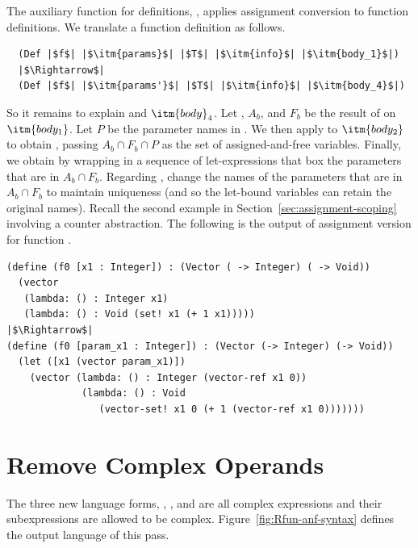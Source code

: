 \documentclass[11pt]{book}
\newcommand{\ocaml}[1]{{\color{blue}{#1}}}
\begin{document}
The auxiliary function for definitions, ,
applies assignment conversion to function definitions.
We translate a function definition as follows.
\begin{lstlisting}
  (Def |$f$| |$\itm{params}$| |$T$| |$\itm{info}$| |$\itm{body_1}$|)
  |$\Rightarrow$|
  (Def |$f$| |$\itm{params'}$| |$T$| |$\itm{info}$| |$\itm{body_4}$|)
\end{lstlisting}
So it remains to explain  and $\itm{body}_4$.
Let , $A_b$, and $F_b$ be the result of
 on $\itm{body_1}$.
Let $P$ be the parameter names in .
We then apply  to $\itm{body_2}$ to
obtain , passing $A_b \cap F_b \cap P$
as the set of assigned-and-free variables.
Finally, we obtain  by wrapping 
in a sequence of let-expressions that box the parameters
that are in $A_b \cap F_b$.
%
Regarding , change the names of the parameters that are
in $A_b \cap F_b$ to maintain uniqueness (and so the let-bound
variables can retain the original names). Recall the second example in
Section~\ref{sec:assignment-scoping} involving a counter
abstraction. The following is the output of assignment version for
function .
\begin{lstlisting}
(define (f0 [x1 : Integer]) : (Vector ( -> Integer) ( -> Void))
  (vector
   (lambda: () : Integer x1)
   (lambda: () : Void (set! x1 (+ 1 x1)))))
|$\Rightarrow$|
(define (f0 [param_x1 : Integer]) : (Vector (-> Integer) (-> Void))
  (let ([x1 (vector param_x1)])
    (vector (lambda: () : Integer (vector-ref x1 0))
             (lambda: () : Void
                (vector-set! x1 0 (+ 1 (vector-ref x1 0)))))))
\end{lstlisting}


\section{Remove Complex Operands}
\label{sec:rco-loop}

The three new language forms, , , and
 are all complex expressions and their subexpressions are
allowed to be complex. \ocaml{The void expression \code{()} is an atom.}
Figure~\ref{fig:Rfun-anf-syntax} defines the
output language \LangFunANF{} of this pass. \ocaml{The OCaml version is
  analogous.}
\end{document}
